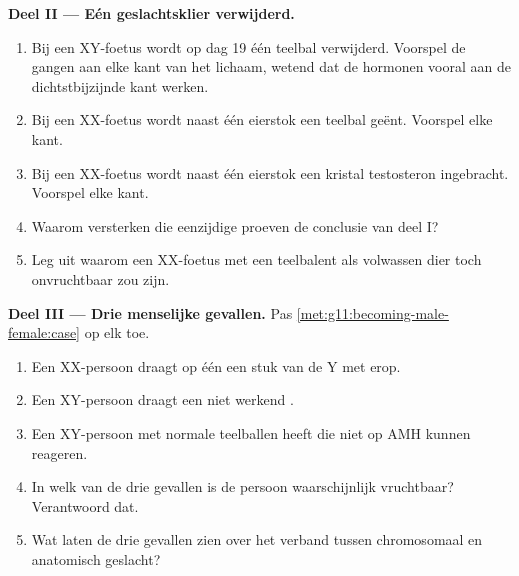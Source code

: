 \begin{problem}
\medskip
\noindent\textbf{Deel II --- Eén geslachtsklier verwijderd.}
\begin{enumerate}[resume]
  \item Bij een XY-foetus wordt op dag 19 één teelbal verwijderd.
        Voorspel de gangen aan elke kant van het lichaam, wetend dat de
        hormonen vooral aan de dichtstbijzijnde kant werken.
  \item Bij een XX-foetus wordt naast één eierstok een teelbal geënt.
        Voorspel elke kant.
  \item Bij een XX-foetus wordt naast één eierstok een kristal
        testosteron ingebracht. Voorspel elke kant.
  \item Waarom versterken die eenzijdige proeven de conclusie van deel I?
  \item Leg uit waarom een XX-foetus met een teelbalent als volwassen
        dier toch onvruchtbaar zou zijn.
\end{enumerate}

\medskip
\noindent\textbf{Deel III --- Drie menselijke gevallen.}
Pas \cref{met:g11:becoming-male-female:case} op elk toe.
\begin{enumerate}[resume]
  \item Een XX-persoon draagt op één  een stuk van de Y met
         erop.
  \item Een XY-persoon draagt een niet werkend .
  \item Een XY-persoon met normale teelballen heeft  die niet op
        AMH kunnen reageren.
  \item In welk van de drie gevallen is de persoon waarschijnlijk
        vruchtbaar? Verantwoord dat.
  \item Wat laten de drie gevallen zien over het verband tussen
        chromosomaal en anatomisch geslacht?
\end{enumerate}


\end{problem}
